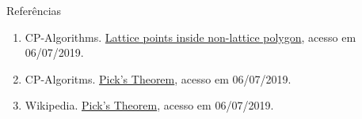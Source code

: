 \begin{frame}[fragile]{Referências}

    \begin{enumerate}

        \item CP-Algorithms. \href{https://cp-algorithms.com/geometry/lattice-points.html}{Lattice points inside non-lattice polygon}, acesso em 06/07/2019.

        \item CP-Algoritms. \href{https://cp-algorithms.com/geometry/picks-theorem.html}{Pick's Theorem}, acesso em 06/07/2019.

        \item Wikipedia. \href{https://en.wikipedia.org/wiki/Pick\%27s_theorem}{Pick's Theorem},
            acesso em 06/07/2019.
    \end{enumerate}

\end{frame}
